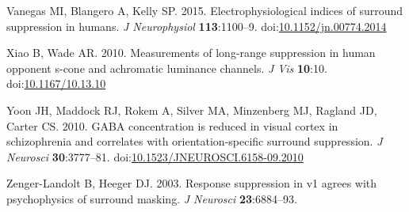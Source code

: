 \documentclass[]{article}
\begin{document}
\leavevmode\hypertarget{ref-Vanegas2015}{}%
Vanegas MI, Blangero A, Kelly SP. 2015. Electrophysiological indices of surround suppression in humans. \emph{J Neurophysiol} \textbf{113}:1100--9. doi:\href{https://doi.org/10.1152/jn.00774.2014}{10.1152/jn.00774.2014}

\leavevmode\hypertarget{ref-Xiao2010}{}%
Xiao B, Wade AR. 2010. Measurements of long-range suppression in human opponent s-cone and achromatic luminance channels. \emph{J Vis} \textbf{10}:10. doi:\href{https://doi.org/10.1167/10.13.10}{10.1167/10.13.10}

\leavevmode\hypertarget{ref-Yoon2010}{}%
Yoon JH, Maddock RJ, Rokem A, Silver MA, Minzenberg MJ, Ragland JD, Carter CS. 2010. GABA concentration is reduced in visual cortex in schizophrenia and correlates with orientation-specific surround suppression. \emph{J Neurosci} \textbf{30}:3777--81. doi:\href{https://doi.org/10.1523/JNEUROSCI.6158-09.2010}{10.1523/JNEUROSCI.6158-09.2010}

\leavevmode\hypertarget{ref-Zenger-Landolt2003}{}%
Zenger-Landolt B, Heeger DJ. 2003. Response suppression in v1 agrees with psychophysics of surround masking. \emph{J Neurosci} \textbf{23}:6884--93.
\end{document}
